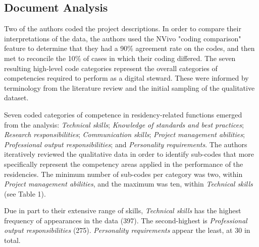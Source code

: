 \documentclass{acm_proc_article-sp}
\begin{document}
\subsection{Document Analysis}
Two of the authors coded the project descriptions. In order to compare their interpretations of the data, the authors used the NVivo "coding comparison" feature to determine that they had a 90\% agreement rate on the codes, and then met to reconcile the 10\% of cases in which their coding differed. The seven resulting high-level code categories represent the overall categories of competencies required to perform as a digital steward. These were informed by terminology from the literature review and the initial sampling of the qualitative dataset.

Seven coded categories of competence in residency-related functions emerged from the analysis: \textit{Technical skills}; \textit{Knowledge of standards and best practices}; \textit{Research responsibilities}; \textit{Communication skills}; \textit{Project management abilities}; \textit{Professional output responsibilities}; and \textit{Personality requirements}. The authors iteratively reviewed the qualitative data in order to identify sub-codes that more specifically represent the competency areas applied in the performance of the residencies. The minimum number of sub-codes per category was two, within \textit{Project management abilities}, and the maximum was ten, within \textit{Technical skills} (see Table 1). 

Due in part to their extensive range of skills, \textit{Technical skills} has the highest frequency of appearances in the data (397). The second-highest is \textit{Professional output responsibilities} (275). \textit{Personality requirements} appear the least, at 30 in total. 
\end{document}
